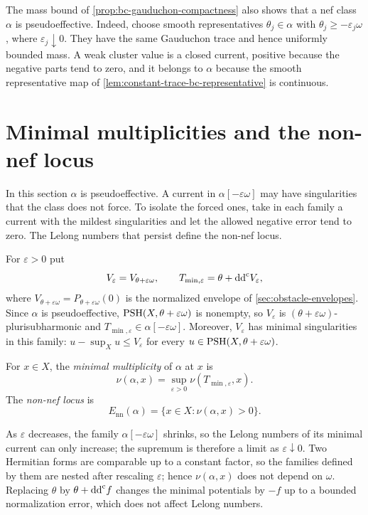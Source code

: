 

The mass bound of \cref{prop:bc-gauduchon-compactness} also shows that a nef class $\alpha$ is pseudoeffective. Indeed, choose smooth representatives $\theta_j\in\alpha$ with $\theta_j\geq-\varepsilon_j\omega$, where $\varepsilon_j\downarrow0$. They have the same Gauduchon trace and hence uniformly bounded mass. A weak cluster value is a closed current, positive because the negative parts tend to zero, and it belongs to $\alpha$ because the smooth representative map of \cref{lem:constant-trace-bc-representative} is continuous.

\section{Minimal multiplicities and the non-nef locus}
\label{sec:bc-minimal-multiplicities}

In this section $\alpha$ is pseudoeffective. A current in $\alpha[-\varepsilon\omega]$ may have singularities that the class does not force. To isolate the forced ones, take in each family a current with the mildest singularities and let the allowed negative error tend to zero. The Lelong numbers that persist define the non-nef locus.

For $\varepsilon>0$ put
\[
 V_\varepsilon=V_{\theta+\varepsilon\omega},
 \qquad T_{\min,\varepsilon}=\theta+\mathrm{dd}^{\mathrm{c}} V_\varepsilon,
\]
where $V_{\theta+\varepsilon\omega}=P_{\theta+\varepsilon\omega}(0)$ is the normalized envelope of \cref{sec:obstacle-envelopes}. Since $\alpha$ is pseudoeffective, $\mathrm{PSH}(X,\theta+\varepsilon\omega)$ is nonempty, so $V_\varepsilon$ is $(\theta+\varepsilon\omega)$-plurisubharmonic and $T_{\min,\varepsilon}\in\alpha[-\varepsilon\omega]$. Moreover, $V_\varepsilon$ has minimal singularities in this family: $u-\sup_Xu\leq V_\varepsilon$ for every $u\in\mathrm{PSH}(X,\theta+\varepsilon\omega)$.

\begin{definition}\label{def:bc-minimal-multiplicity}
For $x\in X$, the \emph{minimal multiplicity} of $\alpha$ at $x$ is
\[
 \nu(\alpha,x)=\sup_{\varepsilon>0}\nu(T_{\min,\varepsilon},x).
\]
The \emph{non-nef locus} is
\[
 E_{\mathrm{nn}}(\alpha)=\{x\in X:\nu(\alpha,x)>0\}.
\]
\end{definition}

As $\varepsilon$ decreases, the family $\alpha[-\varepsilon\omega]$ shrinks, so the Lelong numbers of its minimal current can only increase; the supremum is therefore a limit as $\varepsilon\downarrow0$. Two Hermitian forms are comparable up to a constant factor, so the families defined by them are nested after rescaling $\varepsilon$; hence $\nu(\alpha,x)$ does not depend on $\omega$. Replacing $\theta$ by $\theta+\mathrm{dd}^{\mathrm{c}} f$ changes the minimal potentials by $-f$ up to a bounded normalization error, which does not affect Lelong numbers.

